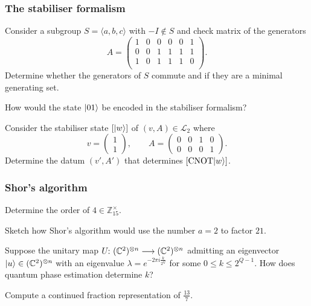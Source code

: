\documentclass[a4paper, oneside, 12pt]{amsart}
\DeclareMathOperator{\CNOT}{CNOT}
\begin{document}
\subsubsection*{The stabiliser formalism}

\begin{thmlist}
  \item Consider a subgroup \(S= \langle a, b, c \rangle \) with \(-I \notin S\) and  check matrix of the generators
  \begin{equation*}
    A=
    \left(\begin{array}{ccc|ccc}
      1 & 0 & 0 & 0 & 0 & 1 \\
      0 & 0 & 1 & 1 & 1 & 1 \\
      1 & 0 & 1 & 1 & 1 & 0 \\
    \end{array}\right).
\end{equation*}
Determine whether the generators of \(S\) commute and if they are a minimal generating set.
\item How would the state \(\lvert01\rangle\) be encoded in the stabiliser formalism?
\item  Consider the stabiliser state \([\lvert w\rangle]\) of \((v, A) \in \mathcal{L}_{2}\) where
\begin{equation*}
  v =
  \begin{pmatrix}
    1\\1
  \end{pmatrix},
  \qquad
  A=
  \left(
    \begin{array}{cc|cc}
      0 & 0 & 1 & 0\\
      0 & 0 & 0 & 1
    \end{array}\right).
\end{equation*}
Determine the datum \((v', A')\) that determines \([\CNOT\ket{w}]\).
\end{thmlist}
\subsubsection*{Shor's algorithm}
\begin{thmlist}
  \item Determine the order of \(4 \in \mathbb{Z}_{15}^{\times}\).
  \item Sketch how Shor's algorithm would use the number \(a= 2\) to factor \(21\).
  \item   Suppose the unitary map \(U \from ( \mathbb{C}^{2})^{\otimes n} \to ( \mathbb{C}^{2})^{\otimes n}\) admitting an eigenvector \(\lvert u\rangle\in ( \mathbb{C}^{2})^{\otimes n}\) with an eigenvalue \(\lambda= e^{-2\pi i \tfrac{k}{2^{Q}}}\) for some \(0 \leq k \leq 2^{Q-1}\).
  How does quantum phase estimation determine \(k\)?
  \item Compute a continued fraction representation of \(\tfrac{13}{7}\).
\end{thmlist}
\end{document}
